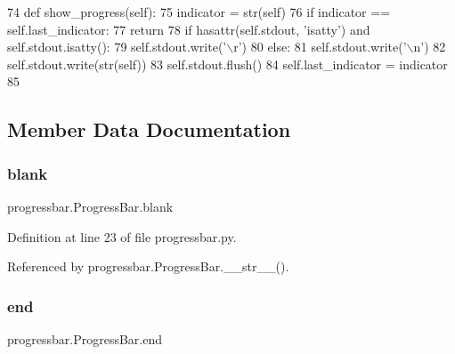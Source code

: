 \begin{DoxyCode}
74     \textcolor{keyword}{def }show\_progress(self):
75         indicator = str(self)
76         \textcolor{keywordflow}{if} indicator == self.last\_indicator:
77           \textcolor{keywordflow}{return}
78         \textcolor{keywordflow}{if} hasattr(self.stdout, \textcolor{stringliteral}{'isatty'}) \textcolor{keywordflow}{and} self.stdout.isatty():
79             self.stdout.write(\textcolor{stringliteral}{'\(\backslash\)r'})
80         \textcolor{keywordflow}{else}:
81             self.stdout.write(\textcolor{stringliteral}{'\(\backslash\)n'})
82         self.stdout.write(str(self))
83         self.stdout.flush()
84         self.last\_indicator = indicator
85 
\end{DoxyCode}


\subsection{Member Data Documentation}
\mbox{\label{classprogressbar_1_1ProgressBar_a0bfce2d34f0a8f034748d77cc5140bc5}} 
\subsubsection{\texorpdfstring{blank}{blank}}
{\footnotesize\ttfamily progressbar.\+Progress\+Bar.\+blank\hspace{0.3cm}{\ttfamily [inherited]}}



Definition at line 23 of file progressbar.\+py.



Referenced by progressbar.\+Progress\+Bar.\+\_\+\+\_\+str\+\_\+\+\_\+().

\mbox{\label{classprogressbar_1_1ProgressBar_a92053e3baab49364971c15373b6c848f}} 
\subsubsection{\texorpdfstring{end}{end}}
{\footnotesize\ttfamily progressbar.\+Progress\+Bar.\+end\hspace{0.3cm}{\ttfamily [inherited]}}



